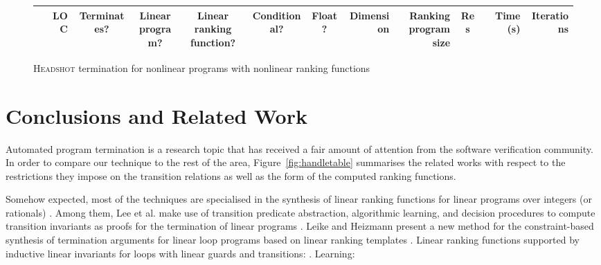 \documentclass[preprint]{sigplanconf}
\theoremstyle{definition}
\begin{document}
\begin{figure*}
\centering
\footnotesize
\begin{tabular}{|l|r|c|c|c|c|c|r|r|c|r|r|}
\hline
    & LOC & Terminates? & \shortstack{Linear \\ program?} & \shortstack{Linear ranking \\ function?}  & Conditional? & Float? & Dimension & \shortstack{Ranking \\ program size} & Res & Time (s) & Iterations\\
    \hline
    \hline

    \hline
\end{tabular}

\caption{\textsc{Headshot} termination for nonlinear programs with nonlinear ranking functions\label{fig:nonlinear}}
 \end{figure*}

 \section{Conclusions and Related Work}
Automated program termination is a research topic that has received a fair amount of attention from the software verification community.
In order to compare our technique to the rest of the area, 
Figure~\ref{fig:handletable} summarises the related works with respect to the restrictions they impose on the transition relations as well as the form of the computed ranking functions. 


Somehow expected, most of the techniques are specialised in the synthesis of linear ranking functions for linear programs over integers (or rationals) \cite{DBLP:conf/pldi/CookPR06,DBLP:conf/cav/LeeWY12,DBLP:conf/popl/Ben-AmramG13,DBLP:conf/vmcai/P04,DBLP:conf/atva/HeizmannHLP13,DBLP:conf/cav/BradleyMS05,DBLP:conf/tacas/CookSZ13}. 
Among them, 
Lee et al. make use of transition predicate abstraction, algorithmic learning, and decision procedures to compute transition
invariants as proofs for the termination of linear programs \cite{DBLP:conf/cav/LeeWY12}.
Leike and Heizmann present a new method for the constraint-based synthesis
of termination arguments for linear loop programs based on
linear ranking templates \cite{DBLP:conf/tacas/LeikeH14}.
Linear ranking functions supported by inductive linear invariants for loops with linear guards and transitions: \cite{DBLP:conf/cav/BradleyMS05}. 
Learning: \cite{DBLP:journals/corr/HeizmannHP14}
\end{document}
